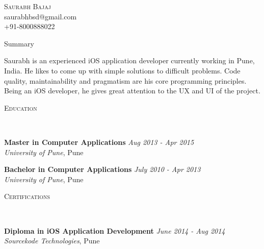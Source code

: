 \documentclass[9pt]{article}
\newenvironment{changemargin}[2]{%
  \begin{list}{}{%
    \setlength{\topsep}{0pt}%
    \setlength{\leftmargin}{#1}%
    \setlength{\rightmargin}{#2}%
    \setlength{\listparindent}{\parindent}%
    \setlength{\itemindent}{\parindent}%
    \setlength{\parsep}{\parskip}%
  }%
  \item[]}{\end{list}
}
\newcommand{\lineover}{
    \begin{changemargin}{-0.05in}{-0.05in}
        \vspace*{-8pt}
        \hrulefill \\
        \vspace*{-2pt}
    \end{changemargin}
}
\newcommand{\header}[1]{
    \begin{changemargin}{-0.5in}{-0.5in}
        \scshape{#1}\\
    \lineover
    \end{changemargin}
}
\newcommand{\contact}[4]{
    \begin{changemargin}{-0.5in}{-0.5in}
        \begin{center}
            {\Large \scshape {#1}}\\ \smallskip
            {#2}\\ \smallskip
            {#3}\\ \smallskip
            {#4}\smallskip
        \end{center}
    \end{changemargin}
}
\newenvironment{body} {
    \vspace*{-16pt}
    \begin{changemargin}{-0.25in}{-0.5in}
  }
    {\end{changemargin}
}
\begin{document}
\contact{Saurabh Bajaj}{saurabhbsd@gmail.com}{+91-8000888022}


\header{Summary}

\begin{body}
    \vspace{14pt}
  Saurabh is an experienced iOS application developer currently working in Pune, India. 
  He likes to come up with simple solutions to difficult problems. 
  Code quality, maintainability and pragmatism are his core programming principles.
  Being an iOS developer, he gives great attention to the UX and UI of the project.

\end{body}

\smallskip


\header{Education}

\begin{body}
    \vspace{14pt}
    \textbf{Master in Computer Applications}{} \hfill \emph{Aug 2013 - Apr 2015}{} \\
    \emph{University of Pune}, Pune{} \\
\end{body}

\begin{body}
    \vspace{14pt}
    \textbf{Bachelor in Computer Applications}{} \hfill \emph{July 2010 - Apr 2013}{} \\
    \emph{University of Pune}, Pune{} \\
\end{body}

\smallskip


\header{Certifications}

\begin{body}
    \vspace{14pt}
    \textbf{Diploma in iOS Application Development}{} \hfill \emph{June 2014 - Aug 2014}{} \\
    \emph{Sourcekode Technologies}, Pune{} \\
\end{body}

\smallskip
\end{document}

